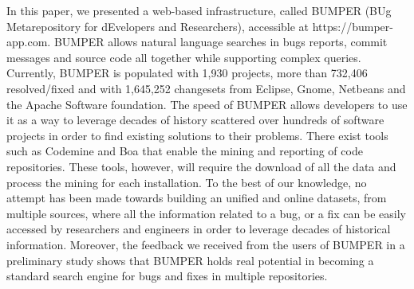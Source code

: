 \documentclass[conference]{IEEEtran}
\begin{document}
In this paper, we presented a web-based infrastructure, called BUMPER (BUg Metarepository for dEvelopers and Researchers), accessible at https://bumper-app.com. BUMPER allows natural language searches in bugs reports, commit messages and source code all together while supporting complex queries. Currently, BUMPER is populated with  1,930 projects, more than 732,406 resolved/fixed and with 1,645,252 changesets from Eclipse, Gnome, Netbeans and the Apache Software foundation. The speed of BUMPER allows developers to use it as a way to leverage decades of history scattered over hundreds of software projects in order to find existing solutions to their problems. There exist tools such as Codemine \cite{Czerwonka2013} and Boa \cite{Bizer2011} that enable the mining and reporting of code repositories. These tools, however, will require the download of all the data and process the mining for each installation. To the best of our knowledge, no attempt has been made towards building an unified and online datasets, from multiple sources, where all the information related to a bug, or a fix can be easily accessed by researchers and engineers in order to leverage decades of historical information. Moreover, the feedback we received from the users of BUMPER in a preliminary study shows that BUMPER holds real potential in becoming a standard search engine for bugs and fixes in multiple repositories.




\end{document}
